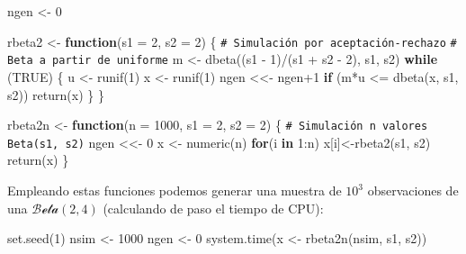 \documentclass[
  10pt,
]{book}
\newenvironment{Shaded}{\begin{snugshade}}{\end{snugshade}}
\newcommand{\AttributeTok}[1]{\textcolor[rgb]{0.77,0.63,0.00}{#1}}
\newcommand{\CommentTok}[1]{\textcolor[rgb]{0.56,0.35,0.01}{\textit{#1}}}
\newcommand{\ConstantTok}[1]{\textcolor[rgb]{0.00,0.00,0.00}{#1}}
\newcommand{\ControlFlowTok}[1]{\textcolor[rgb]{0.13,0.29,0.53}{\textbf{#1}}}
\newcommand{\DecValTok}[1]{\textcolor[rgb]{0.00,0.00,0.81}{#1}}
\newcommand{\FunctionTok}[1]{\textcolor[rgb]{0.00,0.00,0.00}{#1}}
\newcommand{\NormalTok}[1]{#1}
\newcommand{\OtherTok}[1]{\textcolor[rgb]{0.56,0.35,0.01}{#1}}
\newcommand{\SpecialCharTok}[1]{\textcolor[rgb]{0.00,0.00,0.00}{#1}}
\theoremstyle{break}
\theoremstyle{nonumberplain}
\renewcommand{\CommentTok}[1]{\textcolor[rgb]{0.41,0.41,0.41}{\texttt{#1}}}
\begin{document}
\begin{Shaded}
\begin{Highlighting}[]
\NormalTok{ngen }\OtherTok{\textless{}{-}} \DecValTok{0} 

\NormalTok{rbeta2 }\OtherTok{\textless{}{-}} \ControlFlowTok{function}\NormalTok{(}\AttributeTok{s1 =} \DecValTok{2}\NormalTok{, }\AttributeTok{s2 =} \DecValTok{2}\NormalTok{) \{}
  \CommentTok{\# Simulación por aceptación{-}rechazo}
  \CommentTok{\# Beta a partir de uniforme}
\NormalTok{  m }\OtherTok{\textless{}{-}} \FunctionTok{dbeta}\NormalTok{((s1 }\SpecialCharTok{{-}} \DecValTok{1}\NormalTok{)}\SpecialCharTok{/}\NormalTok{(s1 }\SpecialCharTok{+}\NormalTok{ s2 }\SpecialCharTok{{-}} \DecValTok{2}\NormalTok{), s1, s2)}
  \ControlFlowTok{while}\NormalTok{ (}\ConstantTok{TRUE}\NormalTok{) \{}
\NormalTok{    u }\OtherTok{\textless{}{-}} \FunctionTok{runif}\NormalTok{(}\DecValTok{1}\NormalTok{)}
\NormalTok{    x }\OtherTok{\textless{}{-}} \FunctionTok{runif}\NormalTok{(}\DecValTok{1}\NormalTok{)}
\NormalTok{    ngen }\OtherTok{\textless{}\textless{}{-}}\NormalTok{ ngen}\SpecialCharTok{+}\DecValTok{1}
    \ControlFlowTok{if}\NormalTok{ (m}\SpecialCharTok{*}\NormalTok{u }\SpecialCharTok{\textless{}=} \FunctionTok{dbeta}\NormalTok{(x, s1, s2)) }\FunctionTok{return}\NormalTok{(x)}
\NormalTok{  \}}
\NormalTok{\}}

\NormalTok{rbeta2n }\OtherTok{\textless{}{-}} \ControlFlowTok{function}\NormalTok{(}\AttributeTok{n =} \DecValTok{1000}\NormalTok{, }\AttributeTok{s1 =} \DecValTok{2}\NormalTok{, }\AttributeTok{s2 =} \DecValTok{2}\NormalTok{) \{}
  \CommentTok{\# Simulación n valores Beta(s1, s2)}
\NormalTok{  ngen }\OtherTok{\textless{}\textless{}{-}} \DecValTok{0}
\NormalTok{  x }\OtherTok{\textless{}{-}} \FunctionTok{numeric}\NormalTok{(n)}
  \ControlFlowTok{for}\NormalTok{(i }\ControlFlowTok{in} \DecValTok{1}\SpecialCharTok{:}\NormalTok{n) x[i]}\OtherTok{\textless{}{-}}\FunctionTok{rbeta2}\NormalTok{(s1, s2)}
  \FunctionTok{return}\NormalTok{(x)}
\NormalTok{\}}
\end{Highlighting}
\end{Shaded}

Empleando estas funciones podemos generar una muestra de \(10^3\) observaciones de una \(\mathcal{Beta}(2, 4)\) (calculando de paso el tiempo de CPU):

\begin{Shaded}
\begin{Highlighting}[]
\FunctionTok{set.seed}\NormalTok{(}\DecValTok{1}\NormalTok{)}
\NormalTok{nsim }\OtherTok{\textless{}{-}} \DecValTok{1000}
\NormalTok{ngen }\OtherTok{\textless{}{-}} \DecValTok{0}
\FunctionTok{system.time}\NormalTok{(x }\OtherTok{\textless{}{-}} \FunctionTok{rbeta2n}\NormalTok{(nsim, s1, s2))}
\end{Highlighting}
\end{Shaded}
\end{document}
